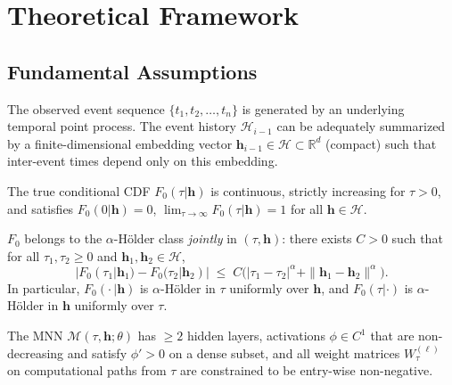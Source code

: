 
\section{Theoretical Framework}
\label{sec:thoe}

\subsection{Fundamental Assumptions}

\begin{assumption}
\label{assumption:foundation}
The observed event sequence $\{t_1, t_2, \ldots, t_n\}$ is generated by an underlying
temporal point process. The event history $\mathcal{H}_{i-1}$ can be adequately
summarized by a finite-dimensional embedding vector $\boldsymbol{h}_{i-1} \in \mathcal{H}
\subset \mathbb{R}^d$ (compact) such that inter-event times depend only on this embedding.
\end{assumption}

\begin{assumption}
\label{assumption:regularity}
The true conditional CDF $F_0(\tau|\boldsymbol{h})$ is continuous, strictly increasing
for $\tau > 0$, and satisfies $F_0(0|\boldsymbol{h}) = 0$,
$\lim_{\tau \to \infty} F_0(\tau|\boldsymbol{h}) = 1$ for all $\boldsymbol{h} \in \mathcal{H}$.
\end{assumption}

\begin{assumption}
\label{assumption:smoothness}
$F_0$ belongs to the $\alpha$-H\"{o}lder class \emph{jointly} in $(\tau, \boldsymbol{h})$:
there exists $C > 0$ such that for all $\tau_1, \tau_2 \geq 0$ and
$\boldsymbol{h}_1, \boldsymbol{h}_2 \in \mathcal{H}$,
\[
|F_0(\tau_1|\boldsymbol{h}_1) - F_0(\tau_2|\boldsymbol{h}_2)|
\;\leq\; C\bigl(|\tau_1-\tau_2|^\alpha + \|\boldsymbol{h}_1 - \boldsymbol{h}_2\|^\alpha\bigr).
\]
In particular, $F_0(\cdot\,|\boldsymbol{h})$ is $\alpha$-H\"{o}lder in $\tau$ uniformly
over $\boldsymbol{h}$, and $F_0(\tau|\cdot)$ is $\alpha$-H\"{o}lder in $\boldsymbol{h}$
uniformly over $\tau$.
\end{assumption}

\begin{assumption}
\label{assumption:architecture}
The MNN $\mathcal{M}(\tau, \boldsymbol{h}; \theta)$ has $\geq 2$ hidden layers,
activations $\phi \in C^1$ that are non-decreasing and satisfy $\phi' > 0$
on a dense subset, and all weight matrices $W^{(\ell)}_\tau$ on computational
paths from $\tau$ are constrained to be entry-wise non-negative.
\end{assumption}

